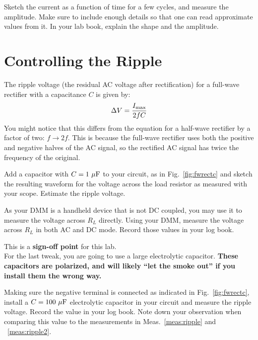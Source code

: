 \begin{measurement}  Sketch the current as a function of time for a few cycles, and measure the amplitude. Make sure to include enough details so that one can read approximate values from it.  In your lab book, explain the shape and the amplitude. \end{measurement}


\section{Controlling the Ripple}

The ripple voltage (the residual AC voltage after rectification) 
for a full-wave rectifier with a capacitance $C$ is given by:
\begin{displaymath}
\Delta V = \frac{I_{\rm max}}{2 f C}
\end{displaymath}
You might notice that this differs from the equation for a half-wave
rectifier by a factor of two: $f \to 2 f$.  This is because the
full-wave rectifier uses both the positive and negative halves of the
AC signal, so the rectified AC signal has twice the frequency of the
original.

\begin{measurement} \label{meas:ripple}
 Add a capacitor with $C=1~\rm{\mu F}$ to your circuit, as in Fig.~\ref{fig:fwrectc} and sketch the resulting waveform for the voltage across the load resistor as measured with your scope.  Estimate the ripple voltage.  \end{measurement}


\begin{measurement}  \label{meas:ripple2} As your DMM is a handheld device that is not DC coupled, you may use it to measure the voltage across $R_L$ directly.  Using your DMM, measure the voltage across $R_L$ in both AC and DC mode. Record those values in your log book. \end{measurement}

This is a \textbf{sign-off point} for this lab. \\

For the last tweak, you are going to use a large electrolytic
capacitor.  {\bf These capacitors are polarized, and will likely ``let
  the smoke out'' if you install them the wrong way.}  
 \begin{measurement}   Making sure the
negative terminal is connected as indicated in Fig.~\ref{fig:fwrectc},
install a $C=100~\rm \mu F$ electrolytic capacitor in your circuit and
measure the ripple voltage. Record the value in your log book. Note down your observation when comparing this value to the measurements in Meas.~\ref{meas:ripple} and ~\ref{meas:ripple2}. \end{measurement}

